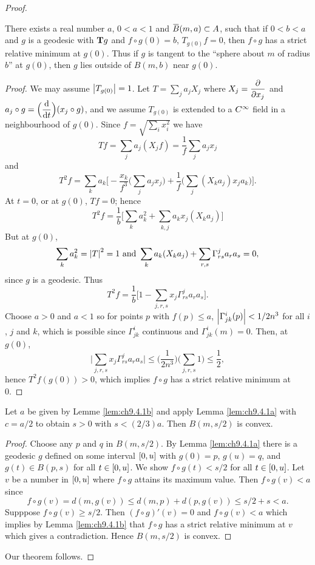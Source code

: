 \documentclass[../main]{subfiles}
\begin{document}
\begin{proof}
\begin{lemma} \label{lem:ch9.4.1b}
There exists a real number $a$, $0<a<1$ and $\xoverline{B}(m,a)\subset A$, such that if $0<b<a$ and $g$ is a geodesic with $\mathbf{T}g$ and $f\circ g(0)=b$, $T_{g(0)} f = 0$, then $f\circ g$ has a strict relative minimum at $g(0)$. Thus if $g$ is tangent to the ``sphere about $m$ of radius $b$'' at $g(0)$, then $g$ lies outside of $B(m,b)$ near $g(0)$.  
\end{lemma}

\begin{proof}
We may assume $\left|T_{g(0)}\right|=1$. Let $T=\displaystyle\sum_j a_j X_j$ where $X_j = \dfrac{\partial }{\partial x_j}$ and \newline $a_j\circ g = \Big(\dv{}{t}\Big)(x_j\circ g)$, and we assume $T_{g(0)}$ is extended to a $C^\infty$ field in a neighbourhood of $g(0)$. Since $f = \sqrt{\displaystyle\sum_i x_i^2}$ we have 
\[Tf=\sum_j a_j (X_j f) = \dfrac{1}{f} \sum_j a_j x_j\] and 
\[T^2 f = \sum_k a_k\bigg[-\dfrac{x_k}{f^3}\bigg(\sum_j a_jx_j\bigg) + \dfrac{1}{f}\bigg(\sum_j (X_ka_j) x_j a_k\bigg)\bigg].\] At $t=0$, or at $g(0)$, $Tf = 0$; hence 
\[T^2 f = \dfrac{1}{b} \bigg[\sum_k a_k^2 + \sum_{k, j} a_kx_j (X_k a_j)\bigg]\] But at $g(0)$,
\[\sum_k a_k^2 = \left|T\right|^2 = 1\text{ and }\sum_k a_k(X_k a_j) + \sum_{r,s} \Gamma^j_{rs} a_r a_s = 0,\] since $g$ is a geodesic. Thus 
\[T^2 f = \dfrac{1}{b}\bigg[1-\sum_{j,r,s} x_j\Gamma^j_{rs} a_r a_s\bigg].\] Choose $a>0$ and $a<1$ so for points $p$ with $f(p)\le a$, $\left|\Gamma^i_{jk} (p)\right|<1/2n^3$ for all $i$, $j$ and $k$, which is possible since $\Gamma^i_{jk}$ continuous and $\Gamma^i_{jk}(m) = 0$. Then, at $g(0)$,
\[
\bigg|\sum_{j,r,s} x_j \Gamma^j_{rs} a_r a_s\bigg| \le \Big(\frac{1}{2n^3}\Big) \bigg(\sum_{j,r,s} 1\bigg) \le \frac{1}{2},
\]
hence $T^2 f(g(0)) > 0$, which implies $f\circ g$ has a strict relative minimum at 0. 
\end{proof}


\begin{lemma} \label{lem:ch9.4.1c}
Let $a$ be given by Lemme \ref{lem:ch9.4.1b} and apply Lemma \ref{lem:ch9.4.1a} with $c=a/2$ to obtain $s>0$ with $s<(2/3)a$. Then $B(m,s/2)$ is convex. 
\end{lemma}

\begin{proof}
Choose any $p$ and $q$ in $B(m, s/2)$. By Lemma \ref{lem:ch9.4.1a} there is a geodesic $g$ defined on some interval $\left[0,u\right]$ with $g(0)=p$, $g(u)=q$, and $g(t) \in B(p,s)$ for all $t\in \left[0,u\right]$. We show $f\circ g(t) < s/2$ for all $t\in \left[0,u\right]$. Let $v$ be a number in $\left[0,u\right]$ where $f\circ g$ attains its maximum value. Then $f\circ g(v) < a$ since \[f\circ g(v) = d(m, g(v))\le d(m,p) + d(p, g(v)) \le s/2 + s<a.\] Supppose $f\circ g(v) \ge s/2$. Then $(f\circ g)'(v) = 0$ and $f\circ g(v) < a$ which implies by Lemma \ref{lem:ch9.4.1b} that $f\circ g$ has a strict relative minimum at $v$ which gives a contradiction. Hence $B(m, s/2)$ is convex. 
\end{proof}


Our theorem follows.
\end{proof}
\end{document}
